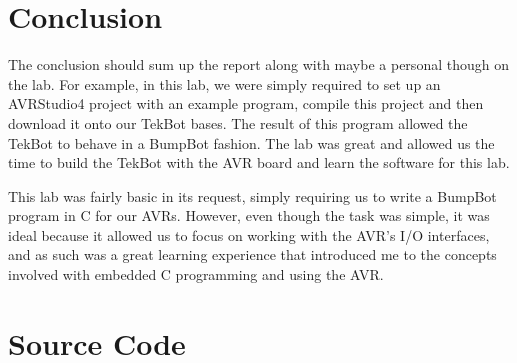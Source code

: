 \documentclass[12pt,letterpaper]{article}
\begin{document}
\section{Conclusion}

The conclusion should sum up the report along with maybe a personal though on
the lab.  For example, in this lab, we were simply required to set up an
AVRStudio4 project with an example program, compile this project and then
download it onto our TekBot bases.  The result of this program allowed the
TekBot to behave in a BumpBot fashion.  The lab was great and allowed us the
time to build the TekBot with the AVR board and learn the software for this
lab.

This lab was fairly basic in its request, simply requiring us to write a
BumpBot program in C for our AVRs.  However, even though the task was simple,
it was ideal because it allowed us to focus on working with the AVR's I/O
interfaces, and as such was a great learning experience that introduced me to
the concepts involved with embedded C programming and using the AVR.

\section{Source Code}
\end{document}
